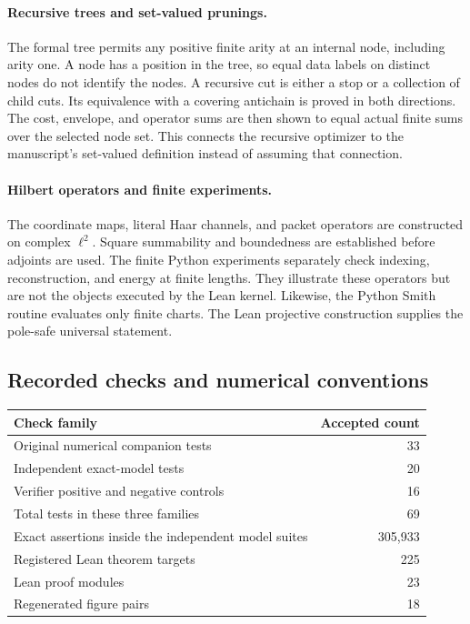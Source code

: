 \documentclass[11pt,letterpaper]{article}
\theoremstyle{plain}
\theoremstyle{plain}
\theoremstyle{plain}
\theoremstyle{definition}
\theoremstyle{definition}
\theoremstyle{definition}
\theoremstyle{definition}
\theoremstyle{remark}
\theoremstyle{remark}
\theoremstyle{remark}
\theoremstyle{remark}
\begin{document}
\paragraph{Recursive trees and set-valued prunings.}
The formal tree permits any positive finite arity at an internal node, including arity one. A node has a position in the tree, so equal data labels on distinct nodes do not identify the nodes. A recursive cut is either a stop or a collection of child cuts. Its equivalence with a covering antichain is proved in both directions. The cost, envelope, and operator sums are then shown to equal actual finite sums over the selected node set. This connects the recursive optimizer to the manuscript's set-valued definition instead of assuming that connection.

\paragraph{Hilbert operators and finite experiments.}
The coordinate maps, literal Haar channels, and packet operators are constructed on complex $\ell^2$. Square summability and boundedness are established before adjoints are used. The finite Python experiments separately check indexing, reconstruction, and energy at finite lengths. They illustrate these operators but are not the objects executed by the Lean kernel. Likewise, the Python Smith routine evaluates only finite charts. The Lean projective construction supplies the pole-safe universal statement.

\subsection{Recorded checks and numerical conventions}

\begin{center}
\begin{tabular}{lr}
\toprule
\textbf{Check family}&\textbf{Accepted count}\\
\midrule
Original numerical companion tests&33\\
Independent exact-model tests&20\\
Verifier positive and negative controls&16\\
Total tests in these three families&69\\
Exact assertions inside the independent model suites&305,933\\
Registered Lean theorem targets&225\\
Lean proof modules&23\\
Regenerated figure pairs&18\\
\bottomrule
\end{tabular}
\end{center}
\end{document}
